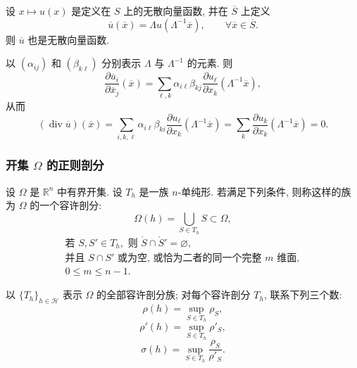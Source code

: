 \begin{Lemma}
\label{lem:ch1-linear-map-preserves-divergence}
设 $x\mapsto u(x)$ 是定义在 $S$ 上的无散向量函数, 并在 $\overline S$ 上定义
\begin{equation}
\overline u(\overline x)=\Lambda u(\Lambda^{-1}\overline x),
\qquad\forall\overline x\in\overline S.
\label{eq:ch1-divergence-preserving-transform}
\end{equation}
则 $\overline u$ 也是无散向量函数.
\end{Lemma}

\begin{Proof}
以 $(\alpha_{ij})$ 和 $(\beta_{k\ell})$ 分别表示 $\Lambda$ 与 $\Lambda^{-1}$ 的元素. 则
\[
\frac{\partial\overline u_i}{\partial\overline x_j}(\overline x)
=\sum_{\ell,k}\alpha_{i\ell}\beta_{kj}
\frac{\partial u_\ell}{\partial x_k}(\Lambda^{-1}\overline x),
\]
从而
\[
(\operatorname{div}\overline u)(\overline x)
=\sum_{i,k,\ell}\alpha_{i\ell}\beta_{ki}
\frac{\partial u_\ell}{\partial x_k}(\Lambda^{-1}\overline x)
=\sum_k\frac{\partial u_k}{\partial x_k}(\Lambda^{-1}\overline x)=0.
\]
\end{Proof}

\subsubsection*{开集 $\Omega$ 的正则剖分}

设 $\Omega$ 是 $\mathbb R^n$ 中有界开集. 设 $T_h$ 是一族 $n$-单纯形. 若满足下列条件, 则称这样的族为 $\Omega$ 的一个容许剖分:
\begin{equation}
\Omega(h)=\bigcup_{S\in T_h}S\subset\Omega,
\label{eq:ch1-triangulation-covered-domain}
\end{equation}
\begin{equation}
\begin{gathered}
\text{若 }S,S'\in T_h,\text{ 则 }\mathring S\cap\mathring S'=\varnothing,\\
\text{并且 }S\cap S'\text{ 或为空, 或恰为二者的同一个完整 }m\text{ 维面},\\
0\leq m\leq n-1.
\end{gathered}
\label{eq:ch1-admissible-triangulation-intersections}
\end{equation}

以 $\{T_h\}_{h\in\mathcal H}$ 表示 $\Omega$ 的全部容许剖分族; 对每个容许剖分 $T_h$, 联系下列三个数:
\begin{equation}
\rho(h)=\sup_{S\in T_h}\rho_S,
\label{eq:ch1-triangulation-max-diameter}
\end{equation}
\begin{equation}
\rho'(h)=\sup_{S\in T_h}\rho'_S,
\label{eq:ch1-triangulation-max-inscribed-diameter}
\end{equation}
\begin{equation}
\sigma(h)=\sup_{S\in T_h}\frac{\rho_S}{\rho'_S}.
\label{eq:ch1-triangulation-shape-ratio}
\end{equation}

